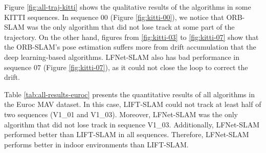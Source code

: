 \documentclass[a4paper, 10pt, conference]{ieeeconf}      %
\begin{document}
Figure \ref{fig:all-traj-kitti} shows the qualitative results of the algorithms in some KITTI sequences. In sequence $00$ (Figure \ref{fig:kitti-00}), we notice that ORB-SLAM was the only algorithm that did not lose track at some part of the trajectory. On the other hand, figures from \ref{fig:kitti-03} to \ref{fig:kitti-07} show that the ORB-SLAM's pose estimation suffers more from drift accumulation that the deep learning-based algorithms. LFNet-SLAM also has bad performance in sequence $07$ (Figure \ref{fig:kitti-07}), as it could not close the loop to correct the drift.

\begin{figure*}[t]
\centering
{}
\qquad
{}

\qquad
{}
\caption{Qualitative results in KITTI dataset.}
\label{fig:all-traj-kitti}
\end{figure*}


Table \ref{tab:all-results-euroc} presents the quantitative results of all algorithms in the Euroc MAV dataset. In this case, LIFT-SLAM could not track at least half of two sequences (V1\_01 and V1\_03). Moreover, LFNet-SLAM was the only algorithm that did not lose track in sequence V1\_03. Additionally, LFNet-SLAM performed better than LIFT-SLAM in all sequences. Therefore, LFNet-SLAM performs better in indoor environments than LIFT-SLAM.
\end{document}

